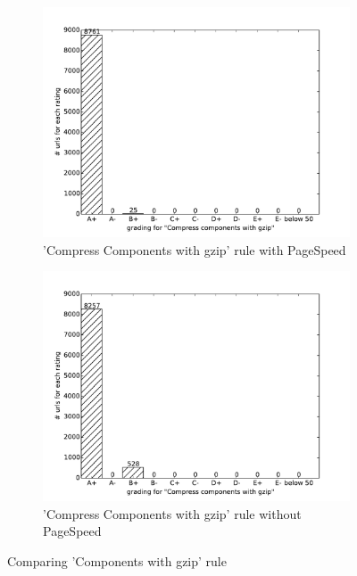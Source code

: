 \documentclass[conference]{IEEEtran}
\begin{document}
\begin{figure}
    \centering
    \begin{subfigure}[b]{\columnwidth}        %
        \centering
	\includegraphics[scale=0.40]{img/virtual-labs/container/Compress components with gzip.pdf}
        \caption{'Compress Components with gzip' rule with PageSpeed}
        \label{fig:ccg-pagespeed}
    \end{subfigure}
    \hfill
    \begin{subfigure}[b]{\columnwidth}        %
        \centering
	 \includegraphics[scale=0.40]{img/virtual-labs/deploy/Compress components with gzip.pdf}
        \caption{'Compress Components with gzip' rule without PageSpeed}
        \label{fig:ccg-nopagespeed}
    \end{subfigure}
    \caption{Comparing 'Components with gzip' rule}
    \label{fig:ccg-comparison}
\end{figure}
\end{document}
